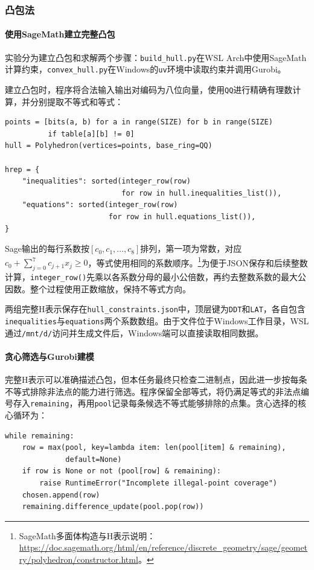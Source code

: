 \clearpage
\subsubsection{凸包法}
\label{subsubsec:lab4-task1-convex-hull}

\paragraph{使用SageMath建立完整凸包}

实验分为建立凸包和求解两个步骤：\texttt{build\_hull.py}在WSL Arch中使用SageMath计算约束，\texttt{convex\_hull.py}在Windows的\texttt{uv}环境中读取约束并调用Gurobi。

建立凸包时，程序将合法输入输出对编码为八位向量，使用\texttt{QQ}进行精确有理数计算，并分别提取不等式和等式：
\begin{lstlisting}
points = [bits(a, b) for a in range(SIZE) for b in range(SIZE)
          if table[a][b] != 0]
hull = Polyhedron(vertices=points, base_ring=QQ)

hrep = {
    "inequalities": sorted(integer_row(row)
                           for row in hull.inequalities_list()),
    "equations": sorted(integer_row(row)
                        for row in hull.equations_list()),
}
\end{lstlisting}

Sage输出的每行系数按$[c_0,c_1,\ldots,c_8]$排列，第一项为常数，对应$c_0+\sum_{j=0}^{7}c_{j+1}x_j\ge0$，等式使用相同的系数顺序。\footnote{SageMath多面体构造与H表示说明：\url{https://doc.sagemath.org/html/en/reference/discrete_geometry/sage/geometry/polyhedron/constructor.html}。}为便于JSON保存和后续整数计算，\texttt{integer\_row()}先乘以各系数分母的最小公倍数，再约去整数系数的最大公因数。整个过程使用正数缩放，保持不等式方向。

两组完整H表示保存在\texttt{hull\_constraints.json}中，顶层键为\texttt{DDT}和\texttt{LAT}，各自包含\texttt{inequalities}与\texttt{equations}两个系数数组。由于文件位于Windows工作目录，WSL通过\texttt{/mnt/d/}访问并生成文件后，Windows端可以直接读取相同数据。

\paragraph{贪心筛选与Gurobi建模}

完整H表示可以准确描述凸包，但本任务最终只检查二进制点，因此进一步按每条不等式排除非法点的能力进行筛选。程序保留全部等式，将仍满足等式的非法点编号存入\texttt{remaining}，再用\texttt{pool}记录每条候选不等式能够排除的点集。贪心选择的核心循环为：
\par\noindent\begin{minipage}{\linewidth}
\begin{lstlisting}
while remaining:
    row = max(pool, key=lambda item: len(pool[item] & remaining),
              default=None)
    if row is None or not (pool[row] & remaining):
        raise RuntimeError("Incomplete illegal-point coverage")
    chosen.append(row)
    remaining.difference_update(pool.pop(row))
\end{lstlisting}
\end{minipage}\par

